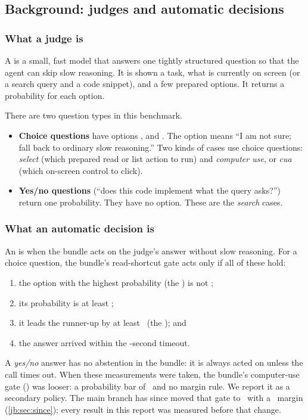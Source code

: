 \subsection{Background: judges and automatic decisions}\label{jb:sec:background}

\subsubsection{What a judge is}

A  is a small, fast model that answers one tightly structured question so that the agent can
skip slow reasoning. It is shown a task, what is currently on screen (or a search query and a code
snippet), and a few prepared options. It returns a probability for each option.

There are two question types in this benchmark.
\begin{itemize}
  \item \textbf{Choice questions} have options ,  and . The option
     means ``I am not sure; fall back to ordinary slow reasoning.'' Two kinds of cases use
    choice questions: \emph{select} (which prepared read or list action to run) and \emph{computer use},
    or \emph{cua} (which on-screen control to click).
  \item \textbf{Yes/no questions} (``does this code implement what the query asks?'') return one
    probability. They have no  option. These are the \emph{search} cases.
\end{itemize}

\subsubsection{What an automatic decision is}

An  is when the bundle acts on the judge's answer without slow reasoning.
For a choice question, the bundle's read-shortcut gate acts only if all of these hold:
\begin{enumerate}
  \item the option with the highest probability (the ) is not ;
  \item its probability is at least \MinP;
  \item it leads the runner-up by at least \MinMargin\ (the ); and
  \item the answer arrived within the \TimeoutS-second timeout.
\end{enumerate}
A \emph{yes/no} answer has no abstention in the bundle: it is always acted on unless the call times
out. When these measurements were taken, the bundle's computer-use gate () was looser:
a probability bar of \CuaMinP\ and no margin rule. We report it as a secondary policy. The main
branch has since moved that gate to \MinP\ with a \MinMargin\ margin (\cref{jb:sec:since}); every result
in this report was measured before that change.

